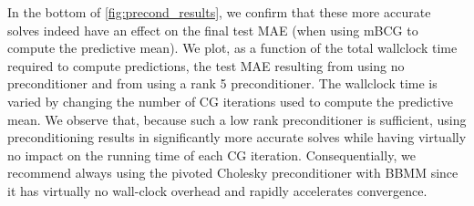 In the bottom of \cref{fig:precond_results}, we confirm that these more accurate solves indeed have an effect on the final test MAE (when using mBCG to compute the predictive mean).
We plot, as a function of the total wallclock time required to compute predictions, the test MAE resulting from using no preconditioner and from using a rank 5 preconditioner.
The wallclock time is varied by changing the number of CG iterations used to compute the predictive mean.
We observe that, because such a low rank preconditioner is sufficient, using preconditioning results in significantly more accurate solves while having virtually no impact on the running time of each CG iteration.
Consequentially, we recommend always using the pivoted Cholesky preconditioner with BBMM since it has virtually no wall-clock overhead and rapidly accelerates convergence.
